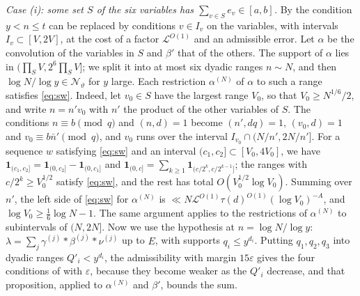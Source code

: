 \documentclass[aps,prd,twocolumn,superscriptaddress,nofootinbib,longbibliography,floatfix,showkeys,nobalancelastpage,amsmath,amssymb,10pt]{revtex4-2}
\theoremstyle{plain}
\theoremstyle{definition}
\theoremstyle{plain}
\newcommand{\eps}{\varepsilon}
\newcommand{\one}{\mathbf{1}}
\begin{document}
\emph{Case (i): some set $S$ of the six variables has $\sum_{v\in S}e_v\in[a,b]$.} By \cite[Lemma~6.2]{May2} the condition $y<n\le t$ can be replaced by conditions $v\in I_v$ on the variables, with intervals $I_v\subset[V,2V]$, at the cost of a factor $\mathcal L^{O(1)}$ and an admissible error. Let $\alpha$ be the convolution of the variables in $S$ and $\beta'$ that of the others. The support of $\alpha$ lies in $(\prod_SV,2^6\prod_SV]$; we split it into at most six dyadic ranges $n\sim N$, and then $\log N/\log y\in\mathcal N_\vartheta$ for $y$ large. Each restriction $\alpha^{(N)}$ of $\alpha$ to such a range satisfies \eqref{eq:sw}. Indeed, let $v_0\in S$ have the largest range $V_0$, so that $V_0\ge N^{1/6}/2$, and write $n=n'v_0$ with $n'$ the product of the other variables of $S$. The conditions $n\equiv b\pmod q$ and $(n,d)=1$ become $(n',dq)=1$, $(v_0,d)=1$ and $v_0\equiv b\bar n'\pmod q$, and $v_0$ runs over the interval $I_{v_0}\cap(N/n',2N/n']$. For a sequence $w$ satisfying \eqref{eq:sw} and an interval $(c_1,c_2]\subset[V_0,4V_0]$, we have $\one_{(c_1,c_2]}=\one_{(0,c_2]}-\one_{(0,c_1]}$ and $\one_{(0,c]}=\sum_{k\ge1}\one_{(c/2^k,c/2^{k-1}]}$; the ranges with $c/2^k\ge V_0^{1/2}$ satisfy \eqref{eq:sw}, and the rest has total $O(V_0^{1/2}\log V_0)$. Summing over $n'$, the left side of \eqref{eq:sw} for $\alpha^{(N)}$ is $\ll N\mathcal L^{O(1)}\tau(d)^{O(1)}(\log V_0)^{-A}$, and $\log V_0\ge\frac16\log N-1$. The same argument applies to the restrictions of $\alpha^{(N)}$ to subintervals of $(N,2N]$. Now we use the hypothesis at $n=\log N/\log y$: $\lambda=\sum_j\gamma^{(j)}*\beta^{(j)}*\nu^{(j)}$ up to $E$, with supports $q_i\le y^{d_i}$. Putting $q_1,q_2,q_3$ into dyadic ranges $Q'_i<y^{d_i}$, the admissibility with margin $15\eps$ gives the four conditions of \cite[Proposition~8.2]{May2} with $\eps$, because they become weaker as the $Q'_i$ decrease, and that proposition, applied to $\alpha^{(N)}$ and $\beta'$, bounds the sum.
\end{document}
